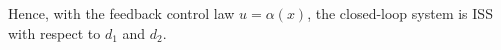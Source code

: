 \documentclass[a4 paper, 12pt]{article}
\begin{document}
Hence, with the feedback control law $u = \alpha(x)$, the closed-loop system is ISS with respect to $d_1$ and $d_2$.


% 



    
\end{document}
